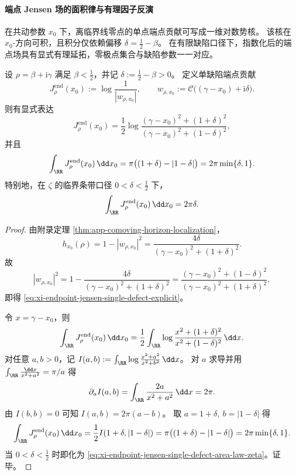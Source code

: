 \paragraph{端点 Jensen 场的面积律与有理因子反演}\label{par:xi-endpoint-jensen-area-law-rational-inversion}
在共动参数 \(x_0\) 下，离临界线零点的单点端点贡献可写成一维对数势核。
该核在 \(x_0\)-方向可积，且积分仅依赖偏移 \(\delta=\tfrac12-\beta\)。
在有限缺陷口径下，指数化后的端点场具有显式有理延拓，零极点集合与缺陷参数一一对应。

\begin{theorem}\label{thm:xi-endpoint-jensen-single-defect-area-law}
设 \(\rho=\beta+\mathrm{i}\gamma\) 满足 \(\beta<\tfrac12\)，并记
\(
\delta:=\tfrac12-\beta>0
\)。
定义单缺陷端点贡献
\begin{equation}\label{eq:xi-endpoint-jensen-single-defect}
J_{\rho}^{\mathrm{end}}(x_0)
:=\log\frac{1}{|w_{\rho,x_0}|},
\qquad
w_{\rho,x_0}:=\mathcal C\!\bigl((\gamma-x_0)+\mathrm{i}\delta\bigr).
\end{equation}
则有显式表达
\begin{equation}\label{eq:xi-endpoint-jensen-single-defect-explicit}
J_{\rho}^{\mathrm{end}}(x_0)
=\frac12\log
\frac{(\gamma-x_0)^2+(1+\delta)^2}{(\gamma-x_0)^2+(1-\delta)^2},
\end{equation}
并且
\begin{equation}\label{eq:xi-endpoint-jensen-single-defect-area-law}
\int_{\RR}J_{\rho}^{\mathrm{end}}(x_0)\,\dd x_0
=\pi\bigl((1+\delta)-|1-\delta|\bigr)
=2\pi\min\{\delta,1\}.
\end{equation}
特别地，在 \(\zeta\) 的临界条带口径 \(0<\delta<\tfrac12\) 下，
\begin{equation}\label{eq:xi-endpoint-jensen-single-defect-area-law-zeta}
\int_{\RR}J_{\rho}^{\mathrm{end}}(x_0)\,\dd x_0=2\pi\delta.
\end{equation}
\end{theorem}

\begin{proof}
由附录定理 \ref{thm:app-comoving-horizon-localization}，
\[
h_{x_0}(\rho)=1-|w_{\rho,x_0}|^2
=\frac{4\delta}{(\gamma-x_0)^2+(1+\delta)^2}.
\]
故
\[
|w_{\rho,x_0}|^2
=1-\frac{4\delta}{(\gamma-x_0)^2+(1+\delta)^2}
=\frac{(\gamma-x_0)^2+(1-\delta)^2}{(\gamma-x_0)^2+(1+\delta)^2},
\]
即得 \eqref{eq:xi-endpoint-jensen-single-defect-explicit}。

令 \(x=\gamma-x_0\)，则
\[
\int_{\RR}J_{\rho}^{\mathrm{end}}(x_0)\,\dd x_0
=\frac12\int_{\RR}\log\frac{x^2+(1+\delta)^2}{x^2+(1-\delta)^2}\,\dd x.
\]
对任意 \(a,b>0\)，记
\(
I(a,b):=\int_{\RR}\log\frac{x^2+a^2}{x^2+b^2}\,\dd x
\)。
对 \(a\) 求导并用
\(
\int_{\RR}\frac{\dd x}{x^2+a^2}=\pi/a
\)
得
\[
\partial_a I(a,b)=\int_{\RR}\frac{2a}{x^2+a^2}\,\dd x=2\pi.
\]
由 \(I(b,b)=0\) 可知 \(I(a,b)=2\pi(a-b)\)。
取 \(a=1+\delta,\ b=|1-\delta|\) 得
\[
\int_{\RR}J_{\rho}^{\mathrm{end}}(x_0)\,\dd x_0
=\frac12I(1+\delta,|1-\delta|)
=\pi\bigl((1+\delta)-|1-\delta|\bigr)
=2\pi\min\{\delta,1\}.
\]
当 \(0<\delta<\tfrac12\) 时即化为 \eqref{eq:xi-endpoint-jensen-single-defect-area-law-zeta}。证毕。
\end{proof}

